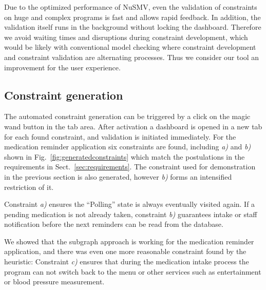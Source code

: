 \documentclass[conference]{IEEEtran}
\begin{document}

Due to the optimized performance of NuSMV, even the validation of constraints on huge and complex programs is fast and allows rapid feedback. In addition, the validation itself runs in the background without locking the dashboard. Therefore we avoid waiting times and disruptions during constraint development, which would be likely with conventional model checking where constraint development and constraint validation are alternating processes. Thus we consider our tool an improvement for the user experience.


\subsection{Constraint generation}
\label{sec:prototypeandevaluation_constraintgeneration}

The automated constraint generation can be triggered by a click on the magic wand button in the tab area. After activation a dashboard is opened in a new tab for each found constraint, and validation is initiated immediately. For the medication reminder application six constraints are found, including \emph{a)} and \emph{b)} shown in Fig.~\ref{fig:generatedconstraints} which match the postulations in the requirements in Sect.~\ref{sec:requirements}.
The constraint used for demonstration in the previous section is also generated, however \emph{b)} forms an intensified restriction of it. 

Constraint \emph{a)} ensures the ``Polling'' state is always eventually visited again. If a pending medication is not already taken, constraint \emph{b)} guarantees intake or staff notification before the next reminders can be read from the database.

We showed that the subgraph approach is working for the medication reminder application, and there was even one more reasonable constraint found by the heuristic: Constraint \emph{c)} ensures that during the medication intake process the program can not switch back to the menu or other services such as entertainment or blood pressure measurement.

\end{document}
